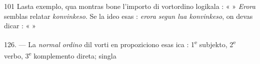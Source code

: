 \begin{VUpage}[105]{101}
Lasta exemplo, qua montras bone l'importo di vortordino\nl
logikala : « \cc
{} » \textit{Erora} semblas relatar \textit{konvinkeso}.\nl
Se la ideo esas : \textit{erora segun lua konvinkeso}, on devas dicar :\nl
« \nl
{} »

\VUblanc{4.65pt}%
126. --- La \textit{normal ordino} dil vorti en propoziciono esas\nl
ica : 1\textsuperscript{e} subjekto, 2\textsuperscript{e} verbo, 3\textsuperscript{e} komplemento direta; singla\parplein
\end{VUpage}


